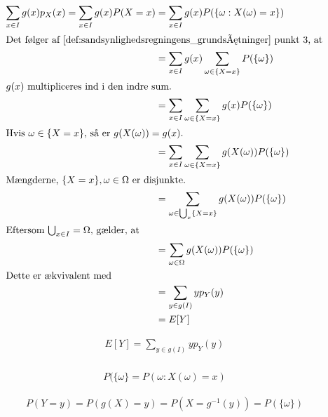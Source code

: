 \begin{bev}
\pagebreak
\begin{align*}
    \sum_{x\in I}g(x)p_X(x)=\sum_{x\in I}g(x)P(X=x)&=\sum_{x\in I} g(x) P(\{\omega: X(\omega)=x\})\\
\intertext{Det følger af \autoref{def:sandsynlighedsregningens_grundsætninger} punkt 3, at}
    &=\sum_{x\in I} g(x)\sum_{\omega\in \{X=x\}} P(\{\omega\})\\
\intertext{$g(x)$ multipliceres ind i den indre sum.}
    &=\sum_{x\in I}\sum_{\omega\in\{X=x\}}g(x)P(\{\omega\})\\
\intertext{Hvis $\omega\in\{X=x\}$, så er $g(X(\omega))=g(x)$.}
    &=\sum_{x\in I} \sum_{\omega\in\{X=x\}} g(X(\omega))P(\{\omega\})\\
\intertext{Mængderne, $\{X=x\}, \omega\in \Omega$ er disjunkte.} 
    &=\sum_{\omega\in\bigcup_x\{X=x\}} g(X(\omega))P(\{\omega\})\\
\intertext{Eftersom $\bigcup_{x\in I}=\Omega$, gælder, at}
    &=\sum_{\omega\in\Omega} g(X(\omega))P(\{\omega\})\\
\intertext{Dette er ækvivalent med}
    &=\sum_{y\in g(I)}y p_Y(y)\\
    &=E[Y]\\
\end{align*}


\begin{align*}
    E[Y]=\sum_{y\in g(I)}y p_Y(y)\\
\end{align*}
\end{bev}

\begin{align*}
    P(\{\omega\}=P(\omega: X(\omega)=x)
\end{align*}

\begin{align*}
    P(Y=y)=P(g(X)=y)=P(X=g^{-1}(y))=P(\{\omega\})
\end{align*}


 




